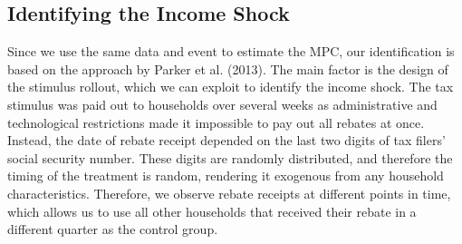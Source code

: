 \subsection{Identifying the Income Shock} \label{subsec:identification}
Since we use the same data and event to estimate the MPC, our identification is based on the approach by Parker et al. (2013). The main factor is the design of the stimulus rollout, which we can exploit to identify the income shock. The tax stimulus was paid out to households over several weeks as administrative and technological restrictions made it impossible to pay out all rebates at once. Instead, the date of rebate receipt depended on the last two digits of tax filers' social security number. These digits are randomly distributed, and therefore the timing of the treatment is random, rendering it exogenous from any household characteristics. Therefore, we observe rebate receipts at different points in time, which allows us to use all other households that received their rebate in a different quarter as the control group. \\
